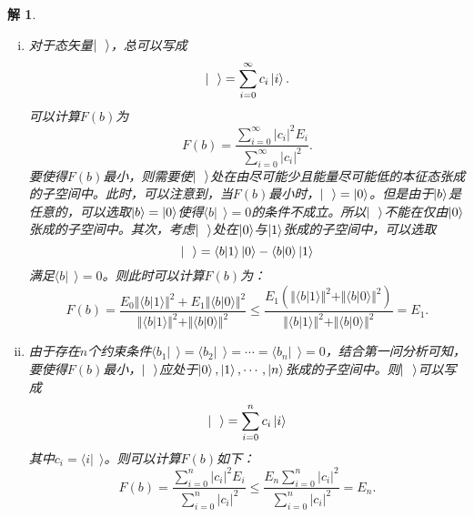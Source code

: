 \documentclass[UTF8,10pt,a4paper]{article}
\theoremstyle{Problem}%
\theoremstyle{Solution}%
\newtheorem*{sol}{解}%
\begin{document}
\begin{sol}
\begin{enumerate}[i)]
    \item 对于态矢量$\ket{~~}$，总可以写成
    \[
        \ket{~~} = \sum_{i=0}^\infty c_i \ket{i}.
    \]
    可以计算$F(b)$为
    \[
        F(b) = \frac{\sum_{i=0}^{\infty} \vert c_i \vert^2 E_i}{\sum_{i=0}^{\infty} \vert c_i \vert^2}.
    \]
    要使得$F(b)$最小，则需要使$\ket{~~}$处在由尽可能少且能量尽可能低的本征态张成的子空间中。此时，可以注意到，当$F(b)$最小时，$\ket{~~} = \ket{0}$。但是由于$\ket{b}$是任意的，可以选取$\ket{b} = \ket{0}$使得$\langle b \vert ~~ \rangle = 0$的条件不成立。所以$\ket{~~}$不能在仅由$\ket{0}$张成的子空间中。其次，考虑$\ket{~~}$处在$\ket{0}$与$\ket{1}$张成的子空间中，可以选取
    \[
        \ket{~~} = \langle b \vert 1 \rangle \ket{0} - \langle b \vert 0 \rangle \ket{1}
    \]
    满足$\langle b \vert ~~ \rangle = 0$。则此时可以计算$F(b)$为：
    \[
        F(b) = \frac{E_0 \Vert \langle b \vert 1 \rangle \Vert^2 + E_1 \Vert \langle b \vert 0 \rangle \Vert^2}{\Vert \langle b \vert 1 \rangle \Vert^2 + \Vert \langle b \vert 0 \rangle \Vert^2} \leq \frac{E_1 \left( \Vert \langle b \vert 1 \rangle \Vert^2 + \Vert \langle b \vert 0 \rangle \Vert^2 \right)}{\Vert \langle b \vert 1 \rangle \Vert^2 + \Vert \langle b \vert 0 \rangle \Vert^2} = E_1.
    \]

    \item 由于存在$n$个约束条件$\langle b_1 \vert ~~ \rangle = \langle b_2 \vert ~~ \rangle = \cdots = \langle b_n \vert ~~ \rangle = 0$，结合第一问分析可知，要使得$F(b)$最小，$\ket{~~}$应处于$\ket{0},\ket{1},\cdots,\ket{n}$张成的子空间中。则$\ket{~~}$可以写成
    \[
        \ket{~~} = \sum_{i=0}^n c_i \ket{i}
    \]
    其中$c_i = \langle i \vert ~~ \rangle$。则可以计算$F(b)$如下：
    \[
        F(b) = \frac{\sum_{i=0}^n \vert c_i \vert^2 E_i}{\sum_{i=0}^n \vert c_i \vert^2} \leq \frac{E_n\sum_{i=0}^n \vert c_i \vert^2}{\sum_{i=0}^n \vert c_i \vert^2} = E_n.
    \]
\end{enumerate}
\end{sol}
\end{document}
